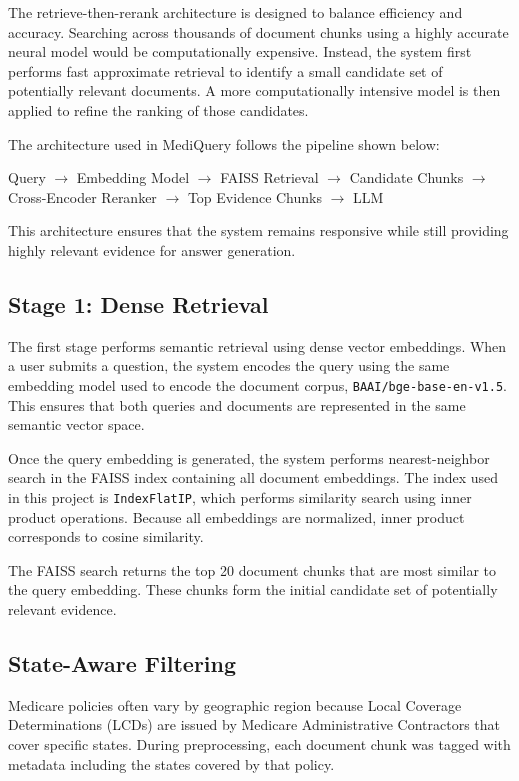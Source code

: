 \documentclass[10pt, letterpaper]{article}
\begin{document}
The retrieve-then-rerank architecture is designed to balance efficiency and accuracy. Searching across thousands of document chunks using a highly accurate neural model would be computationally expensive. Instead, the system first performs fast approximate retrieval to identify a small candidate set of potentially relevant documents. A more computationally intensive model is then applied to refine the ranking of those candidates.

The architecture used in MediQuery follows the pipeline shown below:

\begin{center}
Query $\rightarrow$ Embedding Model $\rightarrow$ FAISS Retrieval $\rightarrow$ Candidate Chunks $\rightarrow$ Cross-Encoder Reranker $\rightarrow$ Top Evidence Chunks $\rightarrow$ LLM
\end{center}

This architecture ensures that the system remains responsive while still providing highly relevant evidence for answer generation.

\subsection{Stage 1: Dense Retrieval}

The first stage performs semantic retrieval using dense vector embeddings. When a user submits a question, the system encodes the query using the same embedding model used to encode the document corpus, \texttt{BAAI/bge-base-en-v1.5}. This ensures that both queries and documents are represented in the same semantic vector space.

Once the query embedding is generated, the system performs nearest-neighbor search in the FAISS index containing all document embeddings. The index used in this project is \texttt{IndexFlatIP}, which performs similarity search using inner product operations. Because all embeddings are normalized, inner product corresponds to cosine similarity.

The FAISS search returns the top 20 document chunks that are most similar to the query embedding. These chunks form the initial candidate set of potentially relevant evidence.

\subsection{State-Aware Filtering}

Medicare policies often vary by geographic region because Local Coverage Determinations (LCDs) are issued by Medicare Administrative Contractors that cover specific states. During preprocessing, each document chunk was tagged with metadata including the states covered by that policy.
\end{document}
